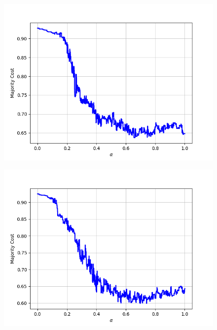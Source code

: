 \begin{figure}[H]
\begin{minipage}{.24\textwidth}
  {\includegraphics[width=\linewidth]{plots/omniglot-intra-sc-cnn/Japanese_(hiragana)}}
\end{minipage}
\begin{minipage}{.24\textwidth}
  \centering
  {\includegraphics[width=\linewidth]{plots/omniglot-intra-sc-cnn/Japanese_(katakana)}}
\end{minipage}
\end{figure}
